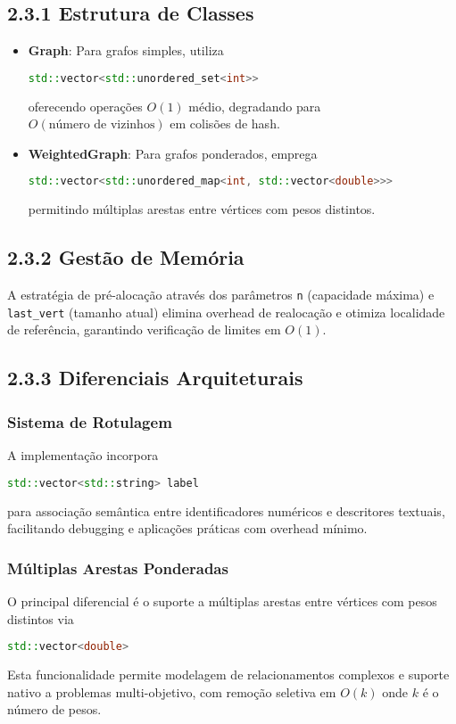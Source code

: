 \documentclass{sbc2023}%
\begin{document}
\subsection{2.3.1 Estrutura de Classes}

\begin{itemize}
    \item \textbf{Graph}: Para grafos simples, utiliza
    \begin{lstlisting}[language=C++]
std::vector<std::unordered_set<int>>
    \end{lstlisting}
    oferecendo operações \(O(1)\) médio, degradando para \(O(\text{número de vizinhos})\) em colisões de hash.

    \item \textbf{WeightedGraph}: Para grafos ponderados, emprega
    \begin{lstlisting}[language=C++]
std::vector<std::unordered_map<int, std::vector<double>>>
    \end{lstlisting}
    permitindo múltiplas arestas entre vértices com pesos distintos.
\end{itemize}

\subsection{2.3.2 Gestão de Memória}

A estratégia de pré-alocação através dos parâmetros \texttt{n} (capacidade máxima) e \texttt{last\_vert} (tamanho atual) elimina overhead de realocação e otimiza localidade de referência, garantindo verificação de limites em \(O(1)\).

\subsection{2.3.3 Diferenciais Arquiteturais}

\subsubsection*{Sistema de Rotulagem}
A implementação incorpora
\begin{lstlisting}[language=C++]
std::vector<std::string> label
\end{lstlisting}
para associação semântica entre identificadores numéricos e descritores textuais, facilitando debugging e aplicações práticas com overhead mínimo.

\subsubsection*{Múltiplas Arestas Ponderadas}
O principal diferencial é o suporte a múltiplas arestas entre vértices com pesos distintos via
\begin{lstlisting}[language=C++]
std::vector<double>
\end{lstlisting}
Esta funcionalidade permite modelagem de relacionamentos complexos e suporte nativo a problemas multi-objetivo, com remoção seletiva em \(O(k)\) onde \(k\) é o número de pesos.
\end{document}
